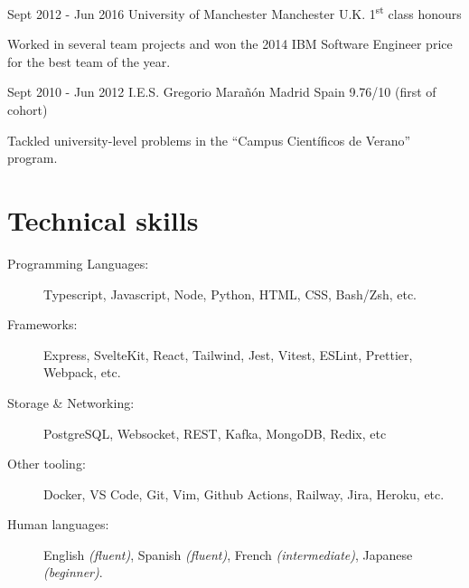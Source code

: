 \documentclass[10pt]{CurriculumVitae}
\begin{document}
      {Sept 2012 - Jun 2016}
      {University of Manchester}
      {Manchester}
      {U.K.}
      {1\textsuperscript{st} class honours}
      {
         \item Worked in several team projects and won the 2014 IBM Software Engineer price for the best team of the year.
      }

      {Sept 2010 - Jun 2012}
      {I.E.S. Gregorio Marañón}
      {Madrid}
      {Spain}
      {9.76/10 (first of cohort)}
      {
        \item Tackled university-level problems in the ``Campus Científicos de Verano'' program.
      }


  \section{Technical skills}

    \begin{description}
      \item[Programming Languages:] Typescript, Javascript, Node, Python, HTML, CSS, Bash/Zsh, etc.
      \item[Frameworks:] Express, SvelteKit, React, Tailwind, Jest, Vitest, ESLint, Prettier, Webpack, etc.
      \item[Storage \& Networking:] PostgreSQL, Websocket, REST, Kafka, MongoDB, Redix, etc
      \item[Other tooling:] Docker, VS Code, Git, Vim, Github Actions, Railway, Jira, Heroku, etc.
      \item[Human languages:] English \emph{(fluent)}, Spanish \emph{(fluent)}, French \emph{(intermediate)}, Japanese \emph{(beginner)}.
    \end{description}
\end{document}
